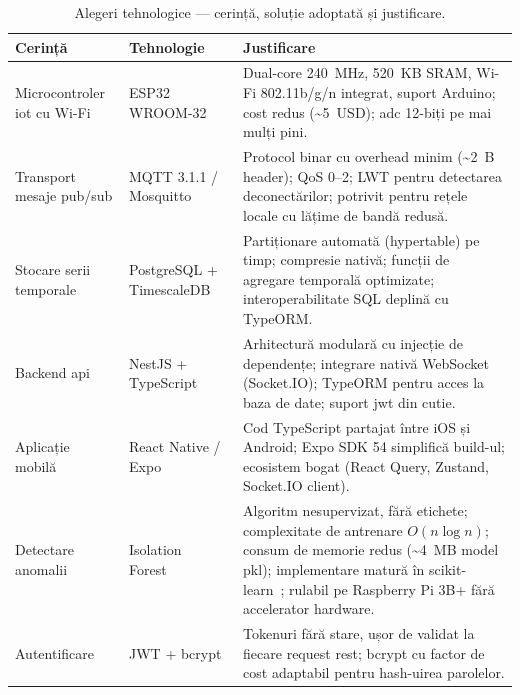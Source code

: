 \begin{table}[H]
  \centering
  \caption{Alegeri tehnologice — cerință, soluție adoptată și justificare.}
  \label{tab:tehnologii}
  \begin{tabular}{@{}p{3.5cm} p{3.2cm} p{6.5cm}@{}}
    \toprule
    \textbf{Cerință} & \textbf{Tehnologie} & \textbf{Justificare} \\
    \midrule
    Microcontroler \gls{iot} cu Wi-Fi
      & ESP32 WROOM-32~\cite{espressif2023esp32}
      & Dual-core 240~MHz, 520~KB SRAM, Wi-Fi 802.11b/g/n integrat, suport Arduino;
        cost redus (\textasciitilde5~USD); \gls{adc} 12-biți pe mai mulți pini. \\
    \addlinespace
    Transport mesaje pub/sub
      & MQTT 3.1.1 / Mosquitto~\cite{oasis2019mqtt,light2017mosquitto}
      & Protocol binar cu overhead minim (\textasciitilde2~B header); QoS 0–2;
        LWT pentru detectarea deconectărilor; potrivit pentru rețele locale cu
        lățime de bandă redusă. \\
    \addlinespace
    Stocare serii temporale
      & PostgreSQL + TimescaleDB~\cite{timescaledb2017,postgresql2024}
      & Partiționare automată (hypertable) pe timp; compresie nativă; funcții de
        agregare temporală optimizate; interoperabilitate SQL deplină cu TypeORM. \\
    \addlinespace
    Backend \gls{api}
      & NestJS + TypeScript~\cite{nestjs2024}
      & Arhitectură modulară cu injecție de dependențe; integrare nativă WebSocket
        (Socket.IO); TypeORM pentru acces la baza de date; suport \gls{jwt} din cutie. \\
    \addlinespace
    Aplicație mobilă
      & React Native / Expo~\cite{reactnative2024,expo2024}
      & Cod TypeScript partajat între iOS și Android; Expo SDK 54 simplifică
        build-ul; ecosistem bogat (React Query, Zustand, Socket.IO client). \\
    \addlinespace
    Detectare anomalii
      & Isolation Forest~\cite{liu2008isolation,liu2012isolationtkdd}
      & Algoritm nesupervizat, fără etichete; complexitate de antrenare
        $O(n \log n)$; consum de memorie redus (\textasciitilde4~MB model pkl);
        implementare matură în scikit-learn~\cite{pedregosa2011scikit};
        rulabil pe Raspberry Pi 3B+ fără accelerator hardware. \\
    \addlinespace
    Autentificare
      & JWT + bcrypt~\cite{jones2015jwt,provos2003bcrypt}
      & Tokenuri fără stare, ușor de validat la fiecare request \gls{rest};
        bcrypt cu factor de cost adaptabil pentru hash-uirea parolelor. \\
    \bottomrule
  \end{tabular}
\end{table}

